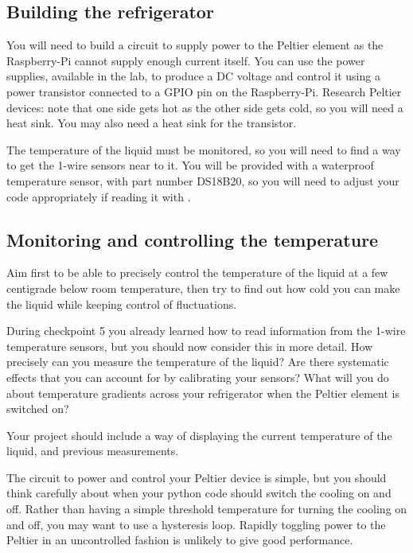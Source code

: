 \subsection{Building the refrigerator}

You will need to build a circuit to supply power to the Peltier element as the Raspberry-Pi cannot supply enough current itself. You can use the power supplies, available in the lab, to produce a DC voltage and control it using a power transistor connected to a GPIO pin on the Raspberry-Pi. 
Research Peltier devices: note that one side gets hot as the other side gets cold, so you will need a heat sink. You may also need a heat sink for the transistor.

The temperature of the liquid must be monitored, so you will need to find a way to get the 1-wire sensors near to it. You will be provided with a waterproof temperature sensor, with part number DS18B20, so you will need to adjust your code appropriately if reading it with \webiopi.

\subsection{Monitoring and controlling the temperature}

Aim first to be able to precisely control the temperature of the liquid at a few centigrade below room temperature, then try to find out how cold you can make the liquid while keeping control of fluctuations.


During checkpoint 5 you already learned how to read information from the 1-wire temperature sensors, but you should now consider this in more detail. How precisely can you measure the temperature of the liquid? Are there systematic effects that you can account for by calibrating your sensors? What will you do about temperature gradients across your refrigerator when the Peltier element is switched on?

Your project should include a way of displaying the current temperature of the liquid, and previous measurements.

The circuit to power and control your Peltier device is simple, but you should think carefully about when your python code should switch the cooling on and off. Rather than having a simple threshold temperature for turning the cooling on and off, you may want to use a hysteresis loop. Rapidly toggling power to the Peltier in an uncontrolled fashion is unlikely to give good performance.


